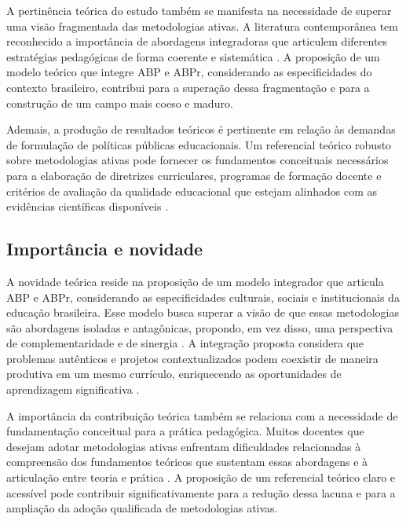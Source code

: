 A pertinência teórica do estudo também se manifesta na necessidade de superar uma visão fragmentada das metodologias ativas. A literatura contemporânea tem reconhecido a importância de abordagens integradoras que articulem diferentes estratégias pedagógicas de forma coerente e sistemática \cite{VALENTE2018}. A proposição de um modelo teórico que integre ABP e ABPr, considerando as especificidades do contexto brasileiro, contribui para a superação dessa fragmentação e para a construção de um campo mais coeso e maduro.

Ademais, a produção de resultados teóricos é pertinente em relação às demandas de formulação de políticas públicas educacionais. Um referencial teórico robusto sobre metodologias ativas pode fornecer os fundamentos conceituais necessários para a elaboração de diretrizes curriculares, programas de formação docente e critérios de avaliação da qualidade educacional que estejam alinhados com as evidências científicas disponíveis \cite{BRASIL2018}.

\subsection{Importância e novidade}
\label{subsec:jt_importancia}

A novidade teórica reside na proposição de um modelo integrador que articula ABP e ABPr, considerando as especificidades culturais, sociais e institucionais da educação brasileira. Esse modelo busca superar a visão de que essas metodologias são abordagens isoladas e antagônicas, propondo, em vez disso, uma perspectiva de complementaridade e de sinergia \cite{BACICH2018}. A integração proposta considera que problemas autênticos e projetos contextualizados podem coexistir de maneira produtiva em um mesmo currículo, enriquecendo as oportunidades de aprendizagem significativa \cite{AUSUBEL2000}.

A importância da contribuição teórica também se relaciona com a necessidade de fundamentação conceitual para a prática pedagógica. Muitos docentes que desejam adotar metodologias ativas enfrentam dificuldades relacionadas à compreensão dos fundamentos teóricos que sustentam essas abordagens e à articulação entre teoria e prática \cite{SOARES2021}. A proposição de um referencial teórico claro e acessível pode contribuir significativamente para a redução dessa lacuna e para a ampliação da adoção qualificada de metodologias ativas.

